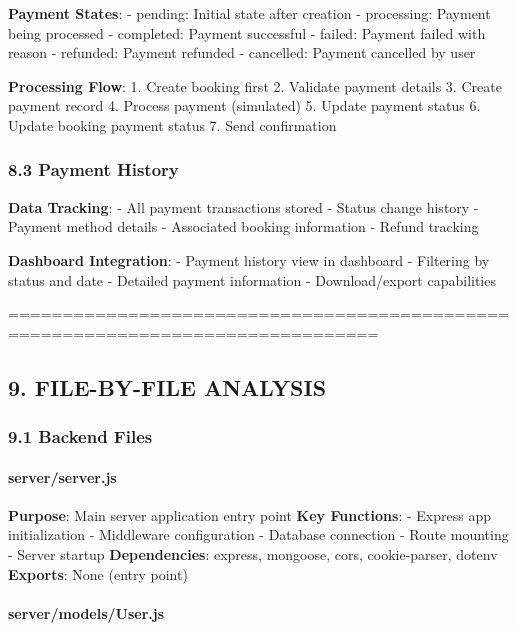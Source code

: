 \documentclass[12pt,a4paper]{article}
\begin{document}
\textbf{Payment States}: - pending: Initial state after creation -
processing: Payment being processed - completed: Payment successful -
failed: Payment failed with reason - refunded: Payment refunded -
cancelled: Payment cancelled by user

\textbf{Processing Flow}: 1. Create booking first 2. Validate payment
details 3. Create payment record 4. Process payment (simulated) 5.
Update payment status 6. Update booking payment status 7. Send
confirmation

\hypertarget{payment-history}{%
\subsubsection{8.3 Payment History}\label{payment-history}}

\textbf{Data Tracking}: - All payment transactions stored - Status
change history - Payment method details - Associated booking information
- Refund tracking

\textbf{Dashboard Integration}: - Payment history view in dashboard -
Filtering by status and date - Detailed payment information -
Download/export capabilities

================================================================================

\hypertarget{file-by-file-analysis}{%
\subsection{9. FILE-BY-FILE ANALYSIS}\label{file-by-file-analysis}}

\hypertarget{backend-files}{%
\subsubsection{9.1 Backend Files}\label{backend-files}}

\hypertarget{serverserver.js}{%
\paragraph{server/server.js}\label{serverserver.js}}

\textbf{Purpose}: Main server application entry point \textbf{Key
Functions}: - Express app initialization - Middleware configuration -
Database connection - Route mounting - Server startup
\textbf{Dependencies}: express, mongoose, cors, cookie-parser, dotenv
\textbf{Exports}: None (entry point)

\hypertarget{servermodelsuser.js}{%
\paragraph{server/models/User.js}\label{servermodelsuser.js}}
\end{document}
